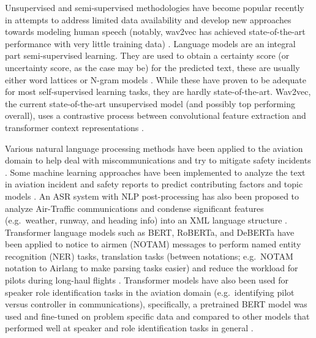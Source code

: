 \documentclass[10pt]{article}
\begin{document}
        Unsupervised and semi-supervised methodologies have become popular recently in attempts to address limited data availability
        and develop new approaches towards modeling human speech (notably, wav2vec has achieved state-of-the-art performance with
        very little training data)
        \cite{baevski_wav2vec_2020,badrinath_automatic_2022,srinivasamurthy_semi-supervised_2017,zuluaga-gomez_contextual_2021}.
        Language models are an integral part semi-supervised learning. They are used to obtain a certainty score (or uncertainty
        score, as the case may be) for the predicted text, these are usually either word lattices or N-gram models
        \cite{badrinath_automatic_2022,srinivasamurthy_semi-supervised_2017,zuluaga-gomez_contextual_2021}.
        While these have proven to be adequate for most self-supervised learning tasks, they are hardly state-of-the-art.
        Wav2vec, the current state-of-the-art unsupervised model (and possibly top performing overall), uses a contrastive process
        between convolutional feature extraction and transformer context representations \cite{baevski_wav2vec_2020}.


        Various natural language processing methods have been applied to the aviation domain to help deal with miscommunications
        and try to mitigate safety incidents \cite{ragnarsdottir_language_2003,tanguy_natural_2016,madeira_machine_2021}.
        Some machine learning approaches have been implemented to analyze the text in aviation incident and safety reports to predict
        contributing factors and topic models \cite{tanguy_natural_2016,madeira_machine_2021}. An ASR system with NLP post-processing
        has also been proposed to analyze Air-Traffic communications and condense significant features (e.g.~weather, runway, and
        heading info) into an XML language structure \cite{ragnarsdottir_language_2003}. Transformer language models such as BERT,
        RoBERTa, and DeBERTa have been applied to notice to airmen (NOTAM) messages to perform named entity recognition (NER) tasks,
        translation tasks (between notations; e.g.~NOTAM notation to Airlang to make parsing tasks easier) and reduce the workload
        for pilots during long-haul flights \cite{arnold_knowledge_2022}. Transformer models have also been used for speaker role
        identification tasks in the aviation domain (e.g.~identifying pilot versus controller in communications), specifically,
        a pretrained BERT model was used and fine-tuned on problem specific data and compared to other models that performed
        well at speaker and role identification tasks in general \cite{guo_comparative_2022}.
\end{document}
